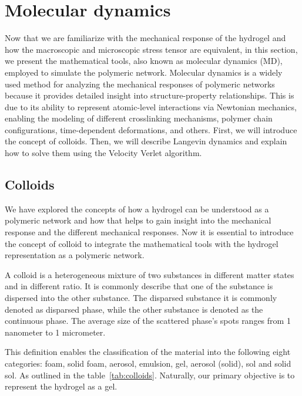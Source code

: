 \section{Molecular dynamics}

Now that we are familiarize with the mechanical response of the hydrogel and how the macroscopic and microscopic stress tensor are equivalent, in this section, we present the mathematical tools, also known as molecular dynamics (MD), employed to simulate the polymeric network.
Molecular dynamics is a widely used method for analyzing the mechanical responses of polymeric networks because it provides detailed insight into structure-property relationships.
This is due to its ability to represent atomic-level interactions via Newtonian mechanics, enabling the modeling of different crosslinking mechanisms, polymer chain configurations, time-dependent deformations, and others.
First, we will introduce the concept of colloids. 
Then, we will describe Langevin dynamics and explain how to solve them using the Velocity Verlet algorithm.

\subsection{Colloids}

We have explored the concepts of how a hydrogel can be understood as a polymeric network and how that helps to gain insight into the mechanical response and the different mechanical responses.
Now it is essential to introduce the concept of colloid to integrate the mathematical tools with the hydrogel representation as a polymeric network.

A colloid is a heterogeneous mixture of two substances in different matter states and in different ratio\citep{castaneda-priegoColloidalSoftMatter2021}.
It is commonly describe that one of the substance is dispersed into the other substance.
The disparsed substance it is commonly denoted as disparsed phase, while the other substance is denoted as the continuous phase.
The average size of the scattered phase's spots ranges from 1 nanometer to 1 micrometer.

This definition enables the classification of the material into the following eight categories:
foam, solid foam,
aerosol, emulsion, gel,
aerosol (solid), sol and solid sol.
As outlined in the table~\ref{tab:colloids}.
Naturally, our primary objective is to represent the hydrogel as a gel.

